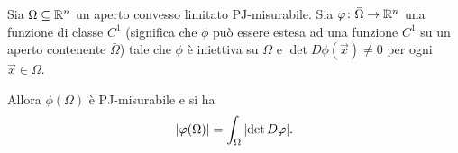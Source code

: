\begin{theorem}
  \label{th:formula-area}
Sia $\Omega\subseteq {\mathbb R}^n$ un aperto convesso limitato PJ-misurabile.
Sia $\varphi\colon \bar \Omega \to {\mathbb R}^n$ una funzione di 
classe $C^1$ (significa che $\phi$ può essere estesa ad una funzione $C^1$ su 
un aperto contenente $\bar \Omega$) 
tale che $\phi$ è iniettiva su $\Omega$ 
e $\det D \phi(\vec x)\neq 0$ per ogni $\vec x\in \Omega$.

Allora $\phi(\Omega)$ è PJ-misurabile e si ha 
\[
  {\left|\varphi(\Omega)\right|} 
    = \int_{\Omega} {\left|\det D\varphi\right|}.
\]


%
\end{theorem}
%

